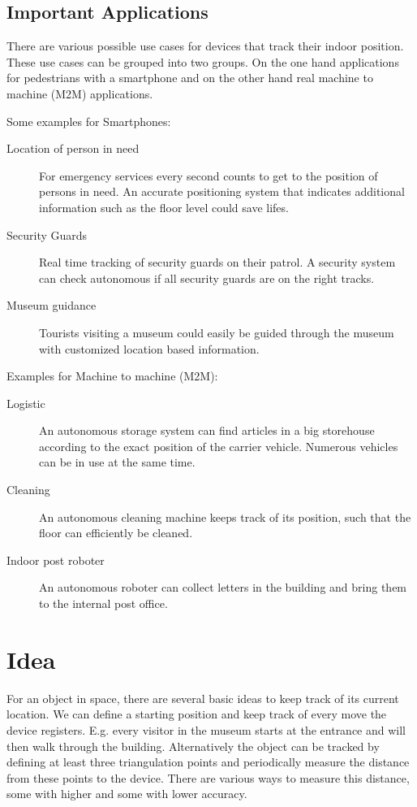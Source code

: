
\subsection{Important Applications}
There are various possible use cases for devices that track their indoor position. These use cases can be grouped into two groups. On the one hand applications for pedestrians with a smartphone and on the other hand real machine to machine (M2M) applications. 

Some examples for Smartphones:
\begin{description}
\item [Location of person in need] For emergency services every second counts to get to the position of persons in need. An accurate positioning system that indicates additional information such as the floor level could save lifes.
\item [Security Guards] Real time tracking of security guards on their patrol. A security system can check autonomous if all security guards are on the right tracks.
\item [Museum guidance] Tourists visiting a museum could easily be guided through the museum with customized location based information.
\end{description}

Examples for Machine to machine (M2M):
\begin{description}
\item [Logistic] An autonomous storage system can find articles in a big storehouse according to the exact position of the carrier vehicle. Numerous vehicles can be in use at the same time.
\item [Cleaning] An autonomous cleaning machine keeps track of its position, such that the floor can efficiently be cleaned.
\item [Indoor post roboter] An autonomous roboter can collect letters in the building and bring them to the internal post office.
\end{description}



\section{Idea}
For an object in space, there are several basic ideas to keep track of its current location. We can define a starting position and keep track of every move the device registers. E.g. every visitor in the museum starts at the entrance and will then walk through the building.
Alternatively the object can be tracked by defining at least three triangulation points and periodically measure the distance from these points to the device. There are various ways to measure this distance, some with higher and some with lower accuracy.

